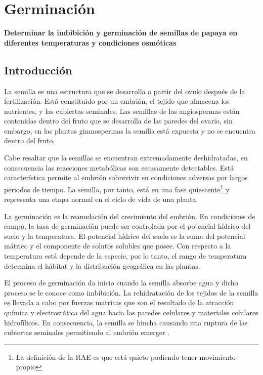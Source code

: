 \chapter[Efecto de la concentraci\'on osm\'otica y temperatura en la imbibici\'on y germinaci\'on de semillas de papaya]{Germinaci\'on}

\begin{Huge}
	\begin{center}
		\textbf{Determinar la imbibici\'on y germinaci\'on de semillas de papaya en diferentes temperaturas y condiciones osm\'oticas}
	\end{center}
\end{Huge}

\section{Introducci\'on}

La semilla es una estructura que se desarrolla a partir del ovulo despu\'es de la fertilizaci\'on. Est\'a constituido por un embri\'on, el tejido que almacena los nutrientes, y las cubiertas seminales. Las semillas de las angiospermas est\'an contenidas dentro del fruto que se desarrolla de las paredes del ovario, sin embargo, en las plantas gimnospermas la semilla est\'a expuesta y no se encuentra dentro del fruto.

Cabe resaltar que la semillas se encuentran extremadamente deshidratadas, en consecuencia las reacciones metab\'olicas son escasamente detectables. Est\'a caracter\'istica permite al embri\'on sobrevivir en condiciones adversas por largos periodos de tiempo. La semilla, por tanto, est\'a en una fase quiescente\footnote{La definici\'on de la RAE es que est\'a quieto pudiendo tener movimiento propio} y representa una etapa normal en el ciclo de vida de una planta. 

La germinaci\'on es la reanudaci\'on del crecimiento del embri\'on. En condiciones de campo, la tasa de germinaci\'on puede ser controlada por el potencial h\'idrico del suelo y la temperatura. El potencial h\'idrico del suelo es la suma del potencial m\'atrico y el componente de solutos solubles que posee. Con respecto a la temperatura est\'a depende de la especie, por lo tanto, el rango de temperatura determina el h\'abitat y la distribuci\'on geogr\'afica en las plantas.

El proceso de germinaci\'on da inicio cuando la semilla absorbe agua y dicho proceso se le conoce como imbibici\'on. La rehidrataci\'on de los tejidos de la semilla es llevada a cabo por fuerzas matricas que son el resultado de la atracción química y electrostática del agua hacia las paredes celulares y materiales celulares hidrof\'ilicos. En consecuencia, la semilla se hincha causando una ruptura de las cubiertas seminales permitiendo al embri\'on emerger \citep{hopkins2009introduction}. 

